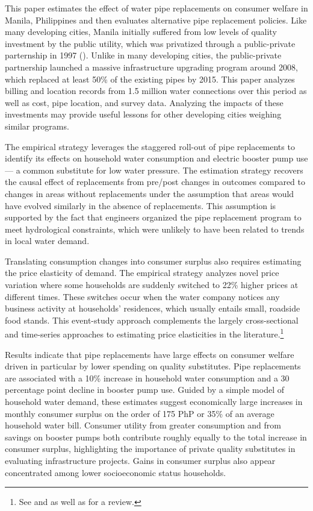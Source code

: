 \documentclass[12pt,table]{article}
\begin{document}
This paper estimates the effect of water pipe replacements on consumer welfare in Manila, Philippines and then evaluates alternative pipe replacement policies.  Like many developing cities, Manila initially suffered from low levels of quality investment by the public utility, which was privatized through a public-private parternship in 1997 (\cite{dumol2000manila}).  Unlike in many developing cities, the public-private partnership launched a massive infrastructure upgrading program around 2008, which replaced at least 50\% of the existing pipes by 2015.  This paper analyzes billing and location records from 1.5 million water connections over this period as well as cost, pipe location, and survey data.  Analyzing the impacts of these investments may provide useful lessons for other developing cities weighing similar programs.

The empirical strategy leverages the staggered roll-out of pipe replacements to identify its effects on household water consumption and electric booster pump use --- a common substitute for low water pressure.  The estimation strategy recovers the causal effect of replacements from pre/post changes in outcomes compared to changes in areas without replacements under the assumption that areas would have evolved similarly in the absence of replacements.  This assumption is supported by the fact that engineers organized the pipe replacement program to meet hydrological constraints, which were unlikely to have been related to trends in local water demand. %

Translating consumption changes into consumer surplus also requires estimating the price elasticity of demand.  The empirical strategy analyzes novel price variation where some households are suddenly switched to 22\% higher prices at different times.  These switches occur when the water company notices any business activity at households' residences, which usually entails small, roadside food stands.  This event-study approach complements the largely cross-sectional and time-series approaches to estimating price elasticities in the literature.\footnote{See \cite{szabo2015value} and \cite{mcrae2015infrastructure} as well as \cite{olmstead2009reduced} for a review.}

Results indicate that pipe replacements have large effects on consumer welfare driven in particular by lower spending on quality substitutes.  Pipe replacements are associated with a 10\% increase in household water consumption and a 30 percentage point decline in booster pump use.  Guided by a simple model of household water demand, these estimates suggest economically large increases in monthly consumer surplus on the order of 175 PhP or 35\% of an average household water bill.  Consumer utility from greater consumption and from savings on booster pumps both contribute roughly equally to the total increase in consumer surplus, highlighting the importance of private quality substitutes in evaluating infrastructure projects.  Gains in consumer surplus also appear concentrated among lower socioeconomic status households.  %
\end{document}
